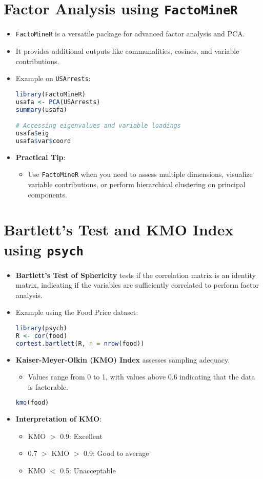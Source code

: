 \section{Factor Analysis using \texttt{FactoMineR}}
\begin{itemize}
    \item \texttt{FactoMineR} is a versatile package for advanced factor analysis and PCA.
    \item It provides additional outputs like communalities, cosines, and variable contributions.
    \item Example on \texttt{USArrests}:
\begin{lstlisting}[language=R]
library(FactoMineR)
usafa <- PCA(USArrests)
summary(usafa)

# Accessing eigenvalues and variable loadings
usafa$eig
usafa$var$coord
\end{lstlisting}

\item \textbf{Practical Tip}:
    \begin{itemize}
        \item Use \texttt{FactoMineR} when you need to assess multiple dimensions, visualize variable contributions, or perform hierarchical clustering on principal components.
    \end{itemize}
\end{itemize}

\section{Bartlett's Test and KMO Index using \texttt{psych}}
\begin{itemize}
    \item \textbf{Bartlett’s Test of Sphericity} tests if the correlation matrix is an identity matrix, indicating if the variables are sufficiently correlated to perform factor analysis.
    \item Example using the Food Price dataset:
\begin{lstlisting}[language=R]
library(psych)
R <- cor(food)
cortest.bartlett(R, n = nrow(food))
\end{lstlisting}

\item \textbf{Kaiser-Meyer-Olkin (KMO) Index} assesses sampling adequacy.
    \begin{itemize}
        \item Values range from 0 to 1, with values above 0.6 indicating that the data is factorable.
    \end{itemize}
\begin{lstlisting}[language=R]
kmo(food)
\end{lstlisting}
\item \textbf{Interpretation of KMO}:
    \begin{itemize}
        \item KMO $>$ 0.9: Excellent
        \item 0.7 $>$ KMO $>$ 0.9: Good to average
        \item KMO $<$ 0.5: Unacceptable
    \end{itemize}
\end{itemize}

